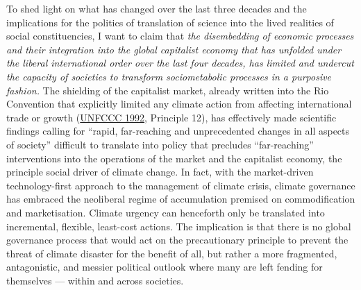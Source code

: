 \documentclass[a4paper, nobind]{templates/ociamthesis}
\begin{document}
To shed light on what has changed over the last three decades and the implications for the politics of translation of science into the lived realities of social constituencies, I want to claim that \emph{the disembedding of economic processes and their integration into the global capitalist economy that has unfolded under the liberal international order over the last four decades, has limited and undercut the capacity of societies to transform sociometabolic processes in a purposive fashion.} The shielding of the capitalist market, already written into the Rio Convention that explicitly limited any climate action from affecting international trade or growth (\protect\hyperlink{ref-unfccc_united_1992}{UNFCCC 1992}, Principle 12), has effectively made scientific findings calling for ``rapid, far-reaching and unprecedented changes in all aspects of society'' difficult to translate into policy that precludes ``far-reaching'' interventions into the operations of the market and the capitalist economy, the principle social driver of climate change. In fact, with the market-driven technology-first approach to the management of climate crisis, climate governance has embraced the neoliberal regime of accumulation premised on commodification and marketisation. Climate urgency can henceforth only be translated into incremental, flexible, least-cost actions. The implication is that there is no global governance process that would act on the precautionary principle to prevent the threat of climate disaster for the benefit of all, but rather a more fragmented, antagonistic, and messier political outlook where many are left fending for themselves --- within and across societies.
\end{document}
